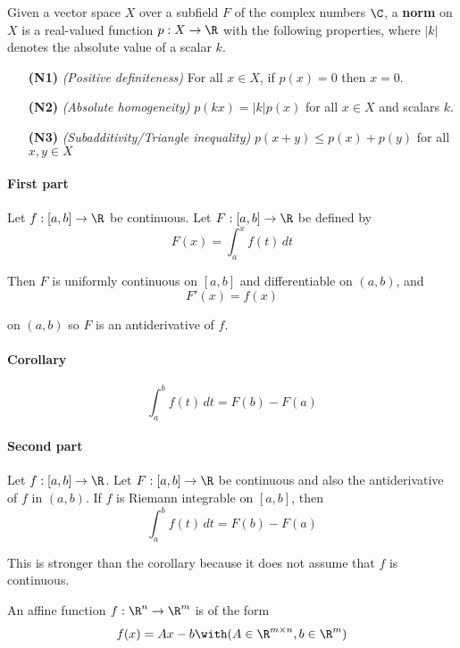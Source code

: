 \label{e0fff96}

Given a vector space $X$ over a subfield $F$ of the complex numbers
$\C$, a \textbf{norm} on $X$ is a real-valued function $p:X\to\R$ with
the following properties, where $|k|$ denotes the absolute value of a
scalar $k$.
\begin{enumerate}
	\item [\textbf{(N1)}] \textit{(Positive definiteness)} For all $x\in
		      X$, if $p(x)=0$ then $x=0$.
	\item [\textbf{(N2)}] \textit{(Absolute homogeneity)}
	      $p(kx)=|k|p(x)$ for all $x\in X$ and scalars $k$.
	\item [\textbf{(N3)}] \textit{(Subadditivity/Triangle inequality)}
	      $p(x+y)\leq p(x)+p(y)$ for all $x,y\in X$
\end{enumerate}

\label{b869dc0}

\paragraph{First part} Let $f:[a,b]\to\R$ be continuous. Let
$F:[a,b]\to\R$ be defined by
$$F(x)=\int_a^xf(t)\,dt$$

Then $F$ is uniformly continuous on $[a,b]$ and differentiable on
$(a,b)$, and
$$F'(x)=f(x)$$

on $(a,b)$ so $F$ is an antiderivative of $f$.

\paragraph{Corollary}
$$\int_a^bf(t)\,dt=F(b)-F(a)$$

\paragraph{Second part} Let $f:[a,b]\to\R$. Let $F:[a,b]\to\R$ be
continuous and also the antiderivative of $f$ in $(a,b)$. If $f$ is
Riemann integrable on $[a,b]$, then
$$\int_a^bf(t)\,dt=F(b)-F(a)$$

This is stronger than the corollary because it does not assume that
$f$ is continuous.

\label{dcb7f73}

An affine function $f:\R^n\to\R^m$ is of the form
$$
	f(x)=Ax-b\with(A\in\R^{m\times n},b\in\R^m)
$$

\label{e9c7871}

